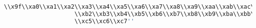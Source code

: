 \begin{lstlisting}[language=bash, basicstyle=\ttfamily\tiny, showstringspaces=false]
                    \\x9f\\xa0\\xa1\\xa2\\xa3\\xa4\\xa5\\xa6\\xa7\\xa8\\xa9\\xaa\\xab\\xac\\xad\\xae\\xaf\\xb0\\xb1
                    \\xb2\\xb3\\xb4\\xb5\\xb6\\xb7\\xb8\\xb9\\xba\\xbb\\xbc\\xbd\\xbe\\xbf\\xc0\\xc1\\xc2\\xc3\\xc4
                    \\xc5\\xc6\\xc7''


\end{lstlisting}
